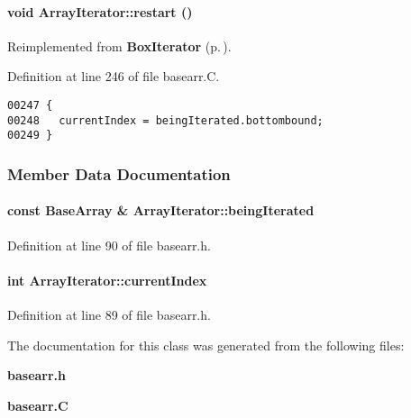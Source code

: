 \paragraph{\setlength{\rightskip}{0pt plus 5cm}void Array\-Iterator::restart ()\hspace{0.3cm}{\tt  [virtual]}}\hfill



Reimplemented from {\bf Box\-Iterator} {\rm (p.\,\pageref{BoxIterator_a6})}.

Definition at line 246 of file basearr.C.\small\begin{verbatim}00247 {
00248   currentIndex = beingIterated.bottombound;
00249 }
\end{verbatim}\normalsize 


\subsubsection{Member Data Documentation}
\label{ArrayIterator_o1}
\paragraph{\setlength{\rightskip}{0pt plus 5cm}const {\bf Base\-Array} \& Array\-Iterator::being\-Iterated\hspace{0.3cm}{\tt  [private]}}\hfill



Definition at line 90 of file basearr.h.\label{ArrayIterator_o0}
\paragraph{\setlength{\rightskip}{0pt plus 5cm}int Array\-Iterator::current\-Index\hspace{0.3cm}{\tt  [private]}}\hfill



Definition at line 89 of file basearr.h.

The documentation for this class was generated from the following files:\begin{CompactItemize}
\item 
{\bf basearr.h}\item 
{\bf basearr.C}\end{CompactItemize}
